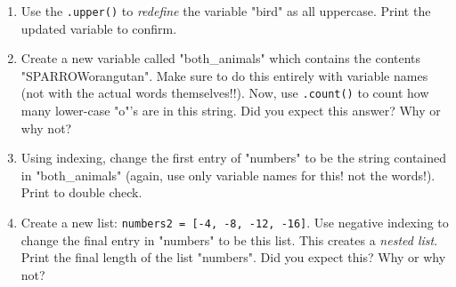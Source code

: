 \documentclass{article}[12pt]
\newcommand{\code}[1]{\texttt{#1}}  %
\begin{document}
\begin{enumerate}
        \item Use the \code{.upper()} to \emph{redefine} the variable "bird" as all uppercase. Print the updated variable to confirm.
    
        \item Create a new variable called "both\_animals" which contains the contents "SPARROWorangutan". Make sure to do this entirely with variable names (not with the actual words themselves!!). Now, use \code{.count()} to count how many lower-case "o"'s are in this string. Did you expect this answer? Why or why not?
    
        \item Using indexing, change the first entry of "numbers" to be the string contained in "both\_animals" (again, use only variable names for this! not the words!). Print to double check. 

        \item Create a new list: \code{numbers2 = [-4, -8, -12, -16]}. Use negative indexing to change the final entry in "numbers" to be this list. This creates a \emph{nested list}. Print the final length of the list "numbers". Did you expect this? Why or why not?

    \end{enumerate}
\end{document}
